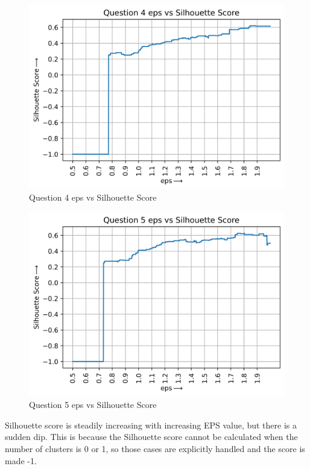 \begin{figure}[H]
    \centering
    \includegraphics[width=0.75\linewidth]{IMAGE/q4_eps&Silhouette.png}
    \caption{Question 4 eps vs Silhouette Score}
    \label{fig14}
\end{figure}

\begin{figure}[H]
    \centering
    \includegraphics[width=0.75\linewidth]{IMAGE/q5_eps&Silhouette.png}
    \caption{Question 5 eps vs Silhouette Score}
    \label{fig15}
\end{figure}
Silhouette score is steadily increasing with increasing EPS value, but there is a sudden dip. This is because the Silhouette score cannot be calculated when the number of clusters is 0 or 1, so those cases are explicitly handled and the score is made -1.

